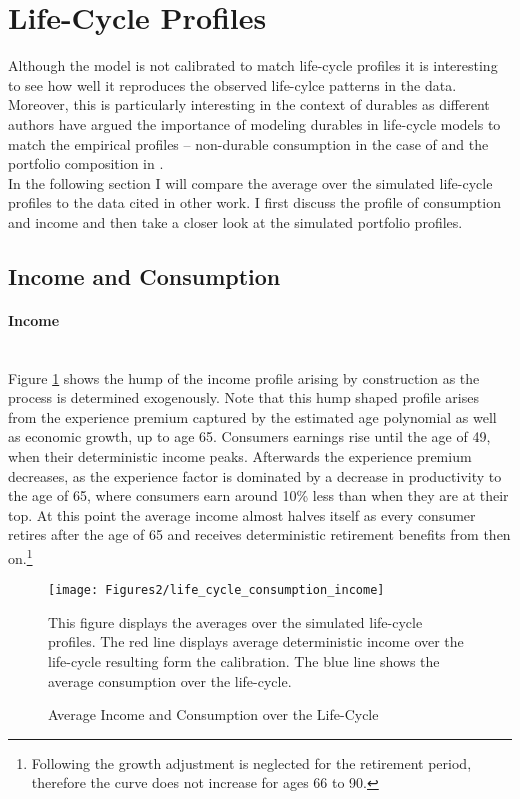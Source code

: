 \documentclass[a4paper,12pt,legno]{article}
\newcommand{\myparagraph}[1]{\paragraph{#1}\mbox{}\\}
\begin{document}
\section{Life-Cycle Profiles}
\label{life_cycle_profiles}

Although the model is not calibrated to match life-cycle profiles it is interesting to see how well it reproduces the observed life-cylce patterns in the data. Moreover, this is particularly interesting in the context of durables as different authors have argued the importance of modeling durables in life-cycle models to match the empirical profiles \--- non-durable consumption in the case of \cite{FV&K2011} and the portfolio composition in \cite{yang2009}. \\
In the following section I will compare the average over the simulated life-cycle profiles to the data cited in other work. I first discuss the profile of consumption and income and then take a closer look at the simulated portfolio profiles. 

\subsection{Income and Consumption}

\myparagraph{Income} Figure \ref{consumption_life_cycle} shows the hump of the income profile arising by construction as the process is determined exogenously. Note that this hump shaped profile arises from the experience premium captured by the estimated age polynomial as well as economic growth, up to age 65. Consumers earnings rise until the age of 49, when their deterministic income peaks. Afterwards the experience premium decreases, as the experience factor is dominated by a decrease in productivity to the age of 65, where consumers earn around 10\% less than when they are at their top. At this point the average income almost halves itself as every consumer retires after the age of 65 and receives deterministic retirement benefits from then on.\footnote{Following \cite{hintermaier2011} the growth adjustment is neglected for the retirement period, therefore the curve does not increase for ages 66 to 90.} 

\begin{figure}[!htbp]
\caption{Average Income and Consumption over the Life-Cycle} 
\label{consumption_life_cycle}	%
\centering
\texttt{[image: Figures2/life\_cycle\_consumption\_income]}  %

\begin{minipage}{0.8\linewidth}
\footnotesize{This figure displays the averages over the simulated life-cycle profiles. The red line displays average deterministic income over the life-cycle resulting form the calibration. The blue line shows the average consumption over the life-cycle.}
\end{minipage}

\end{figure}
\end{document}
